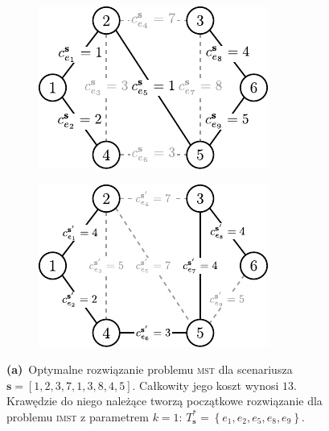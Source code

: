 \begin{figure}[!htbp]
	\null\hfill
	\begin{subfigure}[b]{0.32\textwidth}
		\includegraphics[width=\textwidth]{Chapter_IV/INC-MST-example/a}
		\caption{}
		\label{fig:imstExample:a}
	\end{subfigure}
	\hfill
	\begin{subfigure}[b]{0.32\textwidth}
		\includegraphics[width=\textwidth]{Chapter_IV/INC-MST-example/b}
		\caption{}
		\label{fig:imstExample:b}
	\end{subfigure}
	\hfill\null
	\caption{
		\textbf{(a)}~Optymalne rozwiązanie problemu \textsc{mst} dla scenariusza $\textbf{s} = \left[ 1, 2, 3, 7, 1, 3, 8, 4, 5 \right]$. Całkowity jego koszt wynosi $13$. Krawędzie do niego należące tworzą początkowe rozwiązanie dla problemu \textsc{imst} z parametrem $k = 1$: $T^{\ast}_{\textbf{s}} = \left\{ e_{1}, e_{2}, e_{5}, e_{8}, e_{9} \right\}$.
}
\end{figure}
